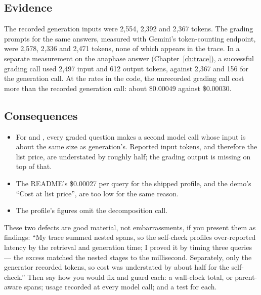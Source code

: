 \subsection{Evidence}

\begin{measured}
The recorded generation inputs were 2,554, 2,392 and 2,367 tokens. The grading prompts for the same answers, measured with Gemini's token-counting endpoint, were 2,578, 2,336 and 2,471 tokens, none of which appears in the trace. In a separate measurement on the anaphase answer (Chapter~\ref{ch:trace}), a successful grading call used 2,497 input and 612 output tokens, against 2,367 and 156 for the generation call. At the rates in the code, the unrecorded grading call cost more than the recorded generation call: about \$0.00049 against \$0.00030.
\end{measured}

\subsection{Consequences}

\begin{itemize}
  \item For  and , every graded question makes a second model call whose input is about the same size as generation's. Reported input tokens, and therefore the list price, are understated by roughly half; the grading output is missing on top of that. \tagI
  \item The README's \$0.00027 per query for the shipped profile, and the demo's \enquote{Cost at list price}, are too low for the same reason. \tagV
  \item The  profile's figures omit the decomposition call. \tagV
\end{itemize}

\begin{interview}
These two defects are good material, not embarrassments, if you present them as findings: \enquote{My trace summed nested spans, so the self-check profiles over-reported latency by the retrieval and generation time; I proved it by timing three queries --- the excess matched the nested stages to the millisecond. Separately, only the generator recorded tokens, so cost was understated by about half for the self-check.} Then say how you would fix and guard each: a wall-clock total, or parent-aware spans; usage recorded at every model call; and a test for each.
\end{interview}

